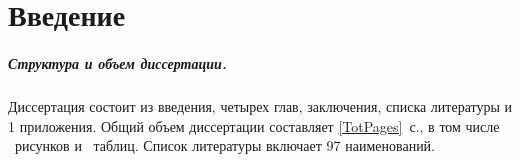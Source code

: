 
\chapter*{Введение}                         %



\paragraph*{Структура и объем диссертации.}
Диссертация состоит из введения,
четырех глав, заключения, списка литературы и 1 приложения.
Общий объем диссертации составляет \ref*{TotPages}~с.,
в том числе \totalfigures{}~рисунков и \totaltables{}~таблиц.
Список литературы включает 97 наименований.
